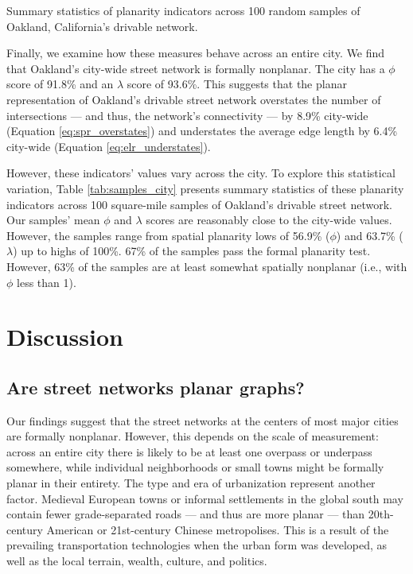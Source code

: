 \documentclass[Afour,sageh,times]{sagej}
\begin{document}
\begin{table}[htbp]
	\centering
	\caption{Summary statistics of planarity indicators across 100 random samples of Oakland, California's drivable network.}
	\label{tab:samples_city}
	
\end{table}

Finally, we examine how these measures behave across an entire city. We find that Oakland's city-wide street network is formally nonplanar. The city has a $\phi$ score of 91.8\% and an $\lambda$ score of 93.6\%. This suggests that the planar representation of Oakland's drivable street network overstates the number of intersections --- and thus, the network's connectivity --- by 8.9\% city-wide (Equation \ref{eq:spr_overstates}) and understates the average edge length by 6.4\% city-wide (Equation \ref{eq:elr_understates}).

However, these indicators' values vary across the city. To explore this statistical variation, Table \ref{tab:samples_city} presents summary statistics of these planarity indicators across 100 square-mile samples of Oakland's drivable street network. Our samples' mean $\phi$ and $\lambda$ scores are reasonably close to the city-wide values. However, the samples range from spatial planarity lows of 56.9\% ($\phi$) and 63.7\% ($\lambda$) up to highs of 100\%. 67\% of the samples pass the formal planarity test. However, 63\% of the samples are at least somewhat spatially nonplanar (i.e., with $\phi$ less than 1).



\section{Discussion}

\subsection{Are street networks planar graphs?}

Our findings suggest that the street networks at the centers of most major cities are formally nonplanar. However, this depends on the scale of measurement: across an entire city there is likely to be at least one overpass or underpass somewhere, while individual neighborhoods or small towns might be formally planar in their entirety. The type and era of urbanization represent another factor. Medieval European towns or informal settlements in the global south may contain fewer grade-separated roads --- and thus are more planar --- than 20th-century American or 21st-century Chinese metropolises. This is a result of the prevailing transportation technologies when the urban form was developed, as well as the local terrain, wealth, culture, and politics.
\end{document}
